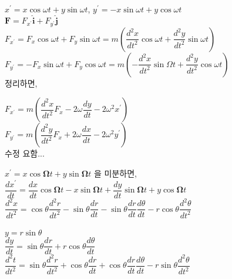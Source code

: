 $ x^{\prime} = x \cos \omega t + y \sin \omega t$, 
$ y^{\prime} = -x \sin \omega t + y \cos \omega t$\\

$ \mathbf {F} = F_{x^{\prime}} \mathbf {\hat{i}}  + F_{y^{\prime}} \mathbf {\hat{j}} $\\

$ F_{x^{\prime}} = F_{x} \cos \omega t + F_{y} \sin \omega t
= m \left ( \dfrac{d^{2}x}{dt^{2}} \cos \omega t + \dfrac{d^{2}y}{dt^{2}} \sin \omega t \right) $\\

$ F_{y^{\prime}} = -F_{x} \sin \omega t + F_{y} \cos \omega t
= m \left ( - \dfrac{d^{2}x}{dt^{2}} \sin \Omega t + \dfrac{d^{2}y}{dt^{2}} \cos \omega t \right) $\\

정리하면,


$ F_{x^{\prime}} = m \left( \dfrac{d^{2}x}{dt^{2}}F_{x} - 2 \omega  \dfrac{dy}{dt} - 2 \omega^{2} x^{\prime}  \right) $\\

$ F_{y^{\prime}} = m \left( \dfrac{d^{2}y}{dt^{2}}F_{x} + 2 \omega  \dfrac{dx}{dt} - 2 \omega^{2} y^{\prime}  \right) $\\



수정 요함...

$ x^{\prime} = x \cos \mathbf {\Omega} t + y \sin \mathbf {\Omega} t$ 을 미분하면,\\

$\dfrac{dx^{\prime}}{dt} = \dfrac{dx}{dt} \cos \mathbf {\Omega} t - x \sin \mathbf {\Omega} t +  \dfrac{dy}{dt} \sin \mathbf {\Omega} t + y \cos \mathbf {\Omega} t $ \\

$\dfrac{d^{2}x}{dt^{2}} = \cos \theta \dfrac{d^{2}r}{dt^{2}} - \sin \theta \dfrac{dr}{dt} - \sin \theta \dfrac{dr}{dt} \dfrac{d\theta}{dt} -r \cos \theta \dfrac{d^{2}\theta}{dt^{2}}$\\
\\
$ y = r \sin \theta $ \\

$\dfrac{dy}{dt} = \sin \theta \dfrac{dr}{dt} + r \cos \theta \dfrac{d\theta}{dt}$ \\

$\dfrac{d^{2}t}{dt^{2}} = \sin \theta \dfrac{d^{2}r}{dt^{2}} + \cos \theta \dfrac{dr}{dt} + \cos \theta \dfrac{dr}{dt} \dfrac{d\theta}{dt} -r \sin \theta \dfrac{d^{2}\theta}{dt^{2}}$\\
\\



